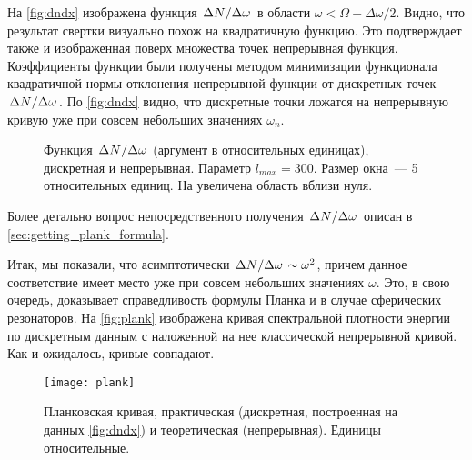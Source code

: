 \documentclass[12pt,a4paper]{article}
\begin{document}
        На \autoref{fig:dndx} изображена функция $\flatfrac{\Delta N}{\Delta \omega}$ в области $\omega < \Omega - \Delta\omega / 2$. Видно, что результат свертки визуально похож на квадратичную функцию. Это подтверждает также и изображенная поверх множества точек непрерывная функция. Коэффициенты функции были получены методом минимизации функционала квадратичной нормы отклонения непрерывной функции от дискретных точек $\flatfrac{\Delta N}{\Delta \omega}$. По \autoref{fig:dndx} видно, что дискретные точки ложатся на непрерывную кривую уже при совсем небольших значениях $\omega_n$.
        \begin{figure}[h]
            \centering
            \hspace{8pt}%
            \hspace{8pt}%
            \caption[]{Функция $\flatfrac{\Delta N}{\Delta \omega}$ (аргумент в относительных единицах), дискретная и непрерывная. Параметр $l_{max} = 300$. Размер окна~--- 5 относительных единиц. На  увеличена область вблизи нуля. %
            } %
            \label{fig:dndx}%
        \end{figure}

        Более детально вопрос непосредственного получения $\flatfrac{\Delta N}{\Delta \omega}$ описан в \autoref{sec:getting_plank_formula}.

        Итак, мы показали, что асимптотически $\flatfrac{\Delta N}{\Delta \omega} \sim \omega^2$, причем данное соответствие имеет место уже при совсем небольших значениях $\omega$. Это, в свою очередь, доказывает справедливость формулы Планка и в случае сферических резонаторов. На \autoref{fig:plank} изображена кривая спектральной плотности энергии по дискретным данным с наложенной на нее классической непрерывной кривой. Как и ожидалось, кривые совпадают.
        \begin{figure}[h]
            \centering
            \texttt{[image: plank]}
            \caption[]{Планковская кривая, практическая (дискретная, построенная на данных \autoref{fig:dndx}) и теоретическая (непрерывная). Единицы относительные.}
            \label{fig:plank}
        \end{figure}
\end{document}
